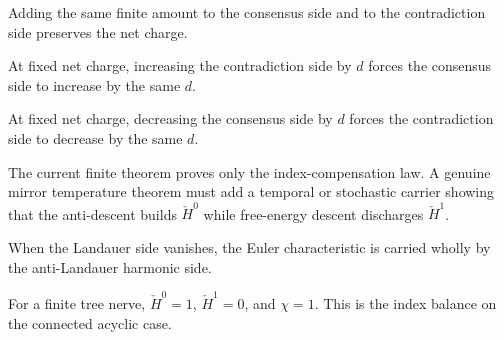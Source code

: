 \begin{theorem}\label{thm:equal-pair-creation-preserves-net}\leanok{}
Adding the same finite amount to the consensus side and to the contradiction
side preserves the net charge.
\end{theorem}

\begin{theorem}\label{thm:fixed-net-cycle-requires-consensus}\leanok{}
At fixed net charge, increasing the contradiction side by $d$ forces the
consensus side to increase by the same $d$.
\end{theorem}

\begin{theorem}\label{thm:fixed-net-consensus-annihilation-requires-cycle-annihilation}\leanok{}
At fixed net charge, decreasing the consensus side by $d$ forces the
contradiction side to decrease by the same $d$.
\end{theorem}

\begin{theorem}\label{thm:anti-descent-mirror-temperature}\notready{}
The current finite theorem proves only the index-compensation law. A genuine
mirror temperature theorem must add a temporal or stochastic carrier showing
that the anti-descent builds $\check H^0$ while free-energy descent discharges
$\check H^1$.
\end{theorem}

\begin{theorem}\label{thm:reversible-index-harmonic}\leanok{}
When the Landauer side vanishes, the Euler characteristic is carried wholly
by the anti-Landauer harmonic side.
\end{theorem}

\begin{theorem}\label{thm:tree-index-balance}\leanok{}
For a finite tree nerve, $\check H^0=1$, $\check H^1=0$, and $\chi=1$.
This is the index balance on the connected acyclic case.
\end{theorem}
